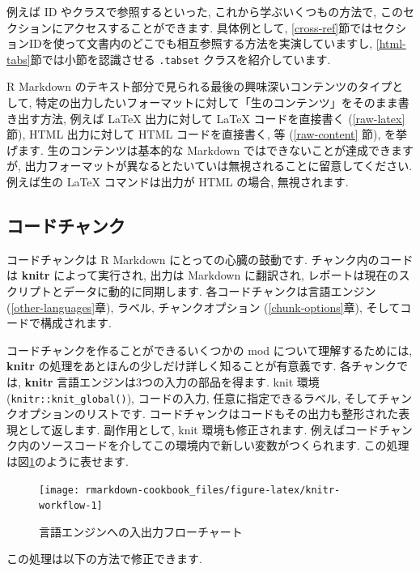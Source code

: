 \documentclass[
  11pt,
]{bxjsreport}
\begin{document}
例えば ID やクラスで参照するといった, これから学ぶいくつもの方法で, このセクションにアクセスすることができます. 具体例として, \ref{cross-ref}節ではセクションIDを使って文書内のどこでも相互参照する方法を実演していますし, \ref{html-tabs}節では小節を認識させる \texttt{.tabset} クラスを紹介しています.

R Markdown のテキスト部分で見られる最後の興味深いコンテンツのタイプとして, 特定の出力したいフォーマットに対して「生のコンテンツ」をそのまま書き出す方法, 例えば LaTeX 出力に対して LaTeX コードを直接書く (\ref{raw-latex} 節), HTML 出力に対して HTML コードを直接書く, 等 (\ref{raw-content} 節), を挙げます. 生のコンテンツは基本的な Markdown ではできないことが達成できますが, 出力フォーマットが異なるとたいていは無視されることに留意してください. 例えば生の LaTeX コマンドは出力が HTML の場合, 無視されます.

\hypertarget{code-chunks}{%
\subsection{コードチャンク}\label{code-chunks}}

コードチャンクは R Markdown にとっての心臓の鼓動です. チャンク内のコードは \textbf{knitr} によって実行され, 出力は Markdown に翻訳され, レポートは現在のスクリプトとデータに動的に同期します. 各コードチャンクは言語エンジン (\ref{other-languages}章), ラベル, チャンクオプション (\ref{chunk-options}章), そしてコードで構成されます.

コードチャンクを作ることができるいくつかの mod について理解するためには, \textbf{knitr} の処理をあとほんの少しだけ詳しく知ることが有意義です. 各チャンクでは, \textbf{knitr} 言語エンジンは3つの入力の部品を得ます. knit 環境 (\texttt{knitr::knit\_global()}), コードの入力, 任意に指定できるラベル, そしてチャンクオプションのリストです. コードチャンクはコードもその出力も整形された表現として返します. 副作用として, knit 環境も修正されます. 例えばコードチャンク内のソースコードを介してこの環境内で新しい変数がつくられます. この処理は図\ref{fig:knitr-workflow}のように表せます.

\begin{figure}

{\centering \texttt{[image: rmarkdown-cookbook\_files/figure-latex/knitr-workflow-1]} 

}

\caption{言語エンジンへの入出力フローチャート}\label{fig:knitr-workflow}
\end{figure}

この処理は以下の方法で修正できます.
\end{document}

